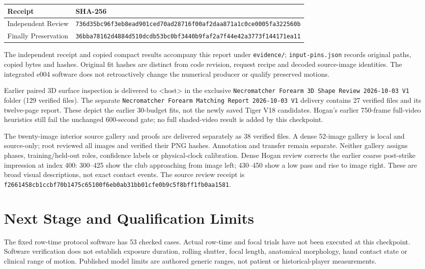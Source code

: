 \documentclass[11pt,letterpaper]{article}
\newcommand{\code}[1]{\nolinkurl{#1}}\newcommand{\hash}[1]{{\footnotesize\nolinkurl{#1}}}
\begin{document}
\begin{tabular}{@{}p{.28\linewidth}p{.65\linewidth}@{}}\toprule
Receipt & SHA-256\\\midrule
Independent Review & \hash{736d35bc96f3eb8ead901ced70ad28716f00af2daa871a1c0ce0005fa322560b}\\
Finally Preservation & \hash{36bba78162d4884d510dcdb53bc0bf3440b9faf2a7f44e42a3773f144171ea11}\\\bottomrule
\end{tabular}\par\smallskip
The independent receipt and copied compact results accompany this report under
\code{evidence/}; \code{input-pins.json} records original paths, copied bytes and hashes.
Original fit hashes are distinct from code revision, request recipe and decoded
source-image identities. The integrated e004 software does not retroactively change
the numerical producer or qualify preserved motions.

Earlier paired 3D surface inspection is delivered to <host> in the exclusive
\texttt{Necromatcher Forearm 3D Shape Review 2026-10-03 V1} folder (129 verified files).
The separate \texttt{Necromatcher Forearm Matching Report 2026-10-03 V1} delivery contains
27 verified files and its twelve-page report. These depict the earlier 30-budget fits,
not the newly saved Tiger V18 candidates. Hogan's earlier 750-frame full-video
heuristics still fail the unchanged 600-second gate; no full shaded-video result
is added by this checkpoint.

The twenty-image interior source gallery and proofs are delivered separately as
38 verified files. A dense 52-image gallery is local and source-only; root reviewed all images and
verified their PNG hashes. Annotation and transfer remain separate. Neither gallery assigns phases,
training/held-out roles, confidence labels or physical-clock calibration. Dense
Hogan review corrects the earlier coarse post-strike impression at index 400:
300--425 show the club approaching from image left; 430--450 show a low pass and
rise to image right. These are broad visual descriptions, not exact contact events.
The source review receipt is
\hash{f2661458cb1ccbf70b1475c65100f6eb0ab31bb01cfe0b9c5f8bff1fb0aa1581}.

\section{Next Stage and Qualification Limits}
The fixed row-time protocol software has 53 checked cases. Actual row-time and focal
trials have not been executed at this checkpoint. Software verification does not
establish exposure duration, rolling shutter, focal length, anatomical morphology,
hand contact state or clinical range of motion. Published model limits are authored
generic ranges, not patient or historical-player measurements.
\end{document}
